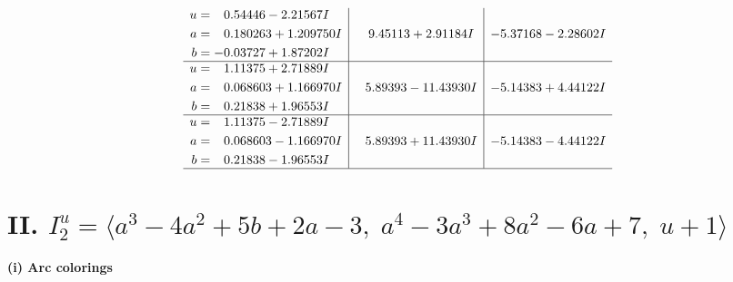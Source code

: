 \documentclass[1p]{elsarticle_modified}
\theoremstyle{definition}
\begin{document}
$$\begin{array}{c|c|c}
\begin{aligned}
u &= \phantom{-}0.54446 - 2.21567 I \\
a &= \phantom{-}0.180263 + 1.209750 I \\
b &= -0.03727 + 1.87202 I\end{aligned}
 & \phantom{-}9.45113 + 2.91184 I & -5.37168 - 2.28602 I \\ \hline\begin{aligned}
u &= \phantom{-}1.11375 + 2.71889 I \\
a &= \phantom{-}0.068603 + 1.166970 I \\
b &= \phantom{-}0.21838 + 1.96553 I\end{aligned}
 & \phantom{-}5.89393 - 11.43930 I & -5.14383 + 4.44122 I \\ \hline\begin{aligned}
u &= \phantom{-}1.11375 - 2.71889 I \\
a &= \phantom{-}0.068603 - 1.166970 I \\
b &= \phantom{-}0.21838 - 1.96553 I\end{aligned}
 & \phantom{-}5.89393 + 11.43930 I & -5.14383 - 4.44122 I\\
 \hline 
 \end{array}$$\newpage\newpage\renewcommand{\arraystretch}{1}
\centering \section*{II. $I^u_{2}= \langle a^3-4 a^2+5 b+2 a-3,\;a^4-3 a^3+8 a^2-6 a+7,\;u+1 \rangle$}
\flushleft \textbf{(i) Arc colorings}\\
\end{document}
